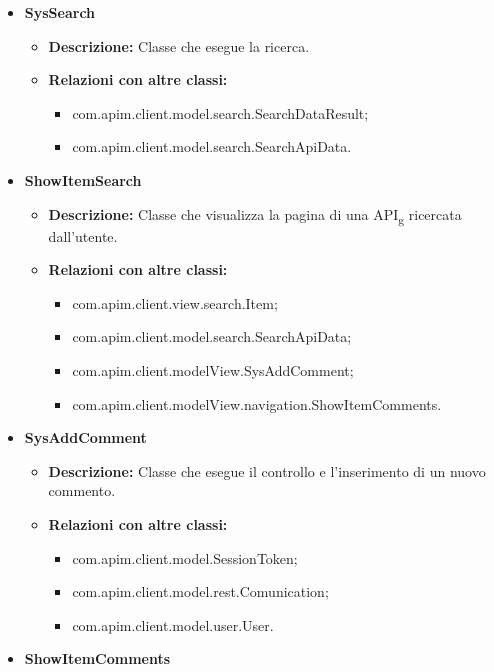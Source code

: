 {{{\begin{itemize}
\begin{itemize}
					\end{itemize}
				\item \textbf{SysSearch}
					\begin{itemize}
						\item \textbf{Descrizione:} Classe che esegue la ricerca.
						\item \textbf{Relazioni con altre classi:}
							\begin{itemize}
								\item com.apim.client.model.search.SearchDataResult;
								\item com.apim.client.model.search.SearchApiData.
							\end{itemize}
					\end{itemize}
				\item \textbf{ShowItemSearch}
					\begin{itemize}
						\item \textbf{Descrizione:} Classe che visualizza la pagina di una API\textsubscript{g} ricercata dall'utente.
						\item \textbf{Relazioni con altre classi:}
							\begin{itemize}
								\item com.apim.client.view.search.Item;
								\item com.apim.client.model.search.SearchApiData;
								\item com.apim.client.modelView.SysAddComment;
								\item com.apim.client.modelView.navigation.ShowItemComments.
							\end{itemize}
					\end{itemize}
				\item \textbf{SysAddComment}
					\begin{itemize}
						\item \textbf{Descrizione:} Classe che esegue il controllo e l'inserimento di un nuovo commento.
						\item \textbf{Relazioni con altre classi:}
							\begin{itemize}
								\item com.apim.client.model.SessionToken;
								\item com.apim.client.model.rest.Comunication;
								\item com.apim.client.model.user.User.
							\end{itemize}
					\end{itemize}
				\item \textbf{ShowItemComments}

\end{itemize}}}}
